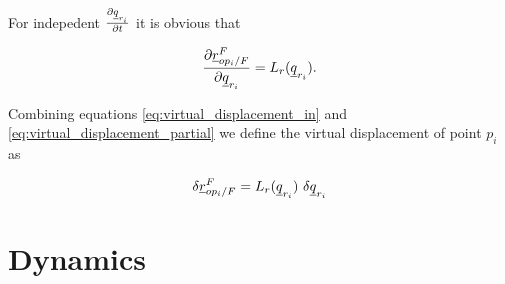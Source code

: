 For indepedent $\frac{\partial \underline{q}_{r_{i}}}{\partial t}$ it is obvious that 

\begin{equation}
    \frac{\partial \pvec{r}{op_{i}}{F}{F}}{\partial \vecd{q}_{r_{i}}}
    = L_{r}(\vecd{q}_{r_{i}}).
    \label{eq:virtual_displacement_partial}
\end{equation}

Combining equations \eqref{eq:virtual_displacement_in} and 
\eqref{eq:virtual_displacement_partial} we define the virtual displacement of 
point $p_{i}$ as  

\begin{equation}
    \delta \pvec{r}{op_{i}}{F}{F} = L_{r}(\vecd{q}_{r_{i}})\ \delta \vecd{q}_{r_{i}}
    \label{eq:virtual_displacement}
\end{equation}

\section{Dynamics}